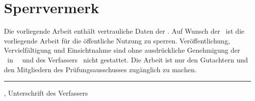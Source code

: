 \thispagestyle{empty}

\section*{Sperrvermerk}
Die vorliegende Arbeit enthält vertrauliche Daten der \mycompany. Auf Wunsch der \mycompany\ ist die vorliegende Arbeit für die
öffentliche Nutzung zu sperren. Veröffentlichung, Vervielfältigung und Einsichtnahme sind
ohne ausdrückliche Genehmigung der \mycompany\ in \myplz\ \mylocation\ und des Verfassers
\myauthor\ nicht gestattet. Die Arbeit ist nur den Gutachtern und den Mitgliedern des
Prüfungsausschusses zugänglich zu machen.
    
\vspace{20mm}

\begin{flushleft}
    \rule{\textwidth}{0.4pt}
    \mylocation, \mysdate
    \hfill
    Unterschrift des Verfassers
\end{flushleft}